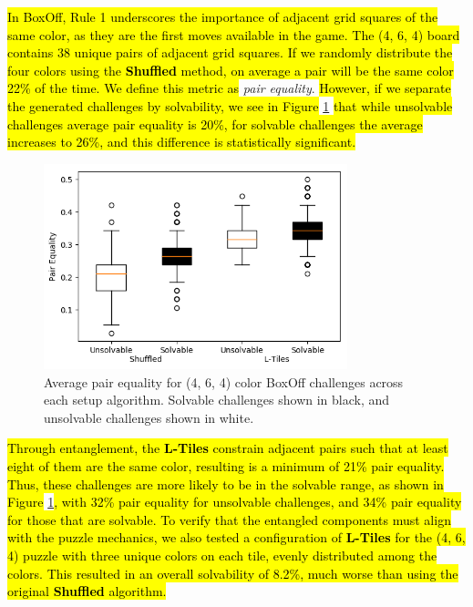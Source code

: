 \documentclass[journal]{IEEEtran}
\begin{document}

\hl{In BoxOff, Rule 1 underscores the importance of adjacent grid squares of the same color, as they are the first moves available in the game. The (4, 6, 4) board contains 38 unique pairs of adjacent grid squares. If we randomly distribute the four colors using the \textbf{ Shuffled} method, on average a pair will be the same color 22\% of the time. We define this metric as} {\it pair equality}. \hl{However, if we separate the generated challenges by solvability, we see in Figure} \ref{fig:boxoffconnected} \hl{that while unsolvable challenges average pair equality is 20\%, for solvable challenges the average increases to 26\%, and this difference is statistically significant.}

\begin{figure}[t]
\includegraphics[width=8.8cm]{pairequal.png}
\caption{Average pair equality for (4, 6, 4) color BoxOff challenges across each setup algorithm. Solvable challenges shown in black, and unsolvable challenges shown in white.}
\label{fig:boxoffconnected}
\end{figure}

\hl{Through entanglement, the \textbf{L-Tiles} constrain adjacent pairs such that at least eight of them are the same color, resulting is a minimum of 21\% pair equality. Thus, these challenges are more likely to be in the solvable range, as shown in Figure} \ref{fig:boxoffconnected}\hl{, with 32\% pair equality for unsolvable challenges, and 34\% pair equality for those that are solvable. To verify that the entangled components must align with the puzzle mechanics, we also tested a configuration of \textbf{L-Tiles} for the (4, 6, 4) puzzle with three unique colors on each tile, evenly distributed among the colors. This resulted in an overall solvability of 8.2\%, much worse than using the original \textbf{Shuffled} algorithm.}
\end{document}
